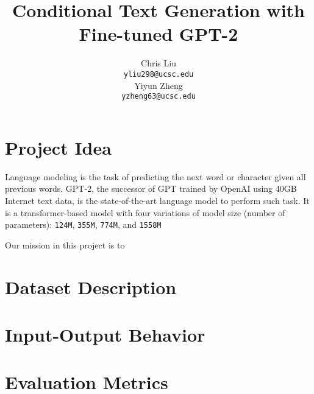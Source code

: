 \documentclass[10pt]{article}
\title{Conditional Text Generation with Fine-tuned GPT-2}
\author{
 Chris Liu \\
    \texttt{yliu298@ucsc.edu} \\
 \And
 Yiyun Zheng \\
    \texttt{yzheng63@ucsc.edu}
}
\date{}
\begin{document}
\maketitle
\section{Project Idea}

Language modeling is the task of predicting the next word or character given all previous words. GPT-2, the successor of GPT \cite{}trained by OpenAI \cite{radford2019language} using 40GB Internet text data, is the state-of-the-art language model to perform such task. It is a transformer-based model with four variations of model size (number of parameters): \texttt{124M}, \texttt{355M}, \texttt{774M}, and \texttt{1558M}

Our mission in this project is to 

\section{Dataset Description}

\section{Input-Output Behavior}

\section{Evaluation Metrics}

\clearpage

\printbibliography 
\end{document}

